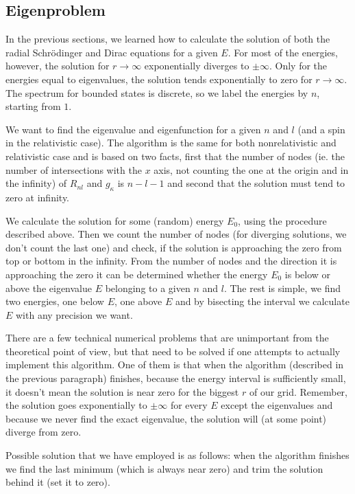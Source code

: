 \subsection{Eigenproblem}

In the previous sections, we learned how to calculate the solution of both the radial Schrödinger and Dirac equations for a given $E$. For most of the energies, however, the solution for $r\to\infty$ exponentially diverges to $\pm\infty$. Only for the energies equal to eigenvalues, the solution tends exponentially to zero for $r\to\infty$. The spectrum for bounded states is discrete, so we label the energies by $n$, starting from $1$.

We want to find the eigenvalue and eigenfunction for a given $n$ and $l$ (and a spin in the relativistic case). The algorithm is the same for both nonrelativistic and relativistic case and is based on two facts, first that the number of nodes (ie. the number of intersections with the $x$ axis, not counting the one at the origin and in the infinity) of $R_{nl}$ and $g_\kappa$ is $n-l-1$ and second that the solution must tend to zero at infinity.

We calculate the solution for some (random) energy $E_0$, using the procedure described above. Then we count the number of nodes (for diverging solutions, we don't count the last one) and check, if the solution is approaching the zero from top or bottom in the infinity. From the number of nodes and the direction it is approaching the zero it can be determined whether the energy $E_0$ is below or above the eigenvalue $E$ belonging to a given $n$ and $l$. The rest is simple, we find two energies, one below $E$, one above $E$ and by bisecting the interval we calculate $E$ with any precision we want.

There are a few technical numerical problems that are unimportant from the theoretical point of view, but that need to be solved if one attempts to actually implement this algorithm. One of them is that when the algorithm (described in the previous paragraph) finishes, because the energy interval is sufficiently small, it doesn't mean the solution is near zero for the biggest $r$ of our grid. Remember, the solution goes exponentially to $\pm\infty$ for every $E$ except the eigenvalues and because we never find the exact eigenvalue, the solution will (at some point) diverge from zero.

Possible solution that we have employed is as follows: when the algorithm finishes we find the last minimum (which is always near zero) and trim the solution behind it (set it to zero).

